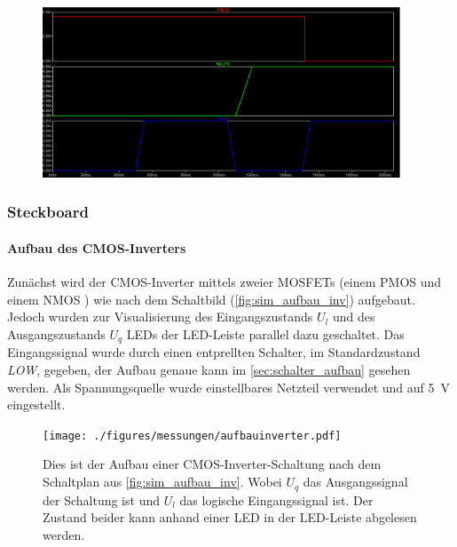\documentclass[12pt,english,ngerman]{scrartcl}
\begin{document}
\begin{figure}[H]
  \centering
    \includegraphics[width=0.95\textwidth]{./simdaten_lab/cmos/nand/nand_funktion.png}
  \caption{}
  \label{fig:sim_nand_wahrheit}
\end{figure}

\subsubsection{Steckboard}
\paragraph{Aufbau des CMOS-Inverters}\label{sec:mess_cmos}
Zunächst wird der CMOS-Inverter mittels zweier MOSFETs (einem PMOS \cite{ZVP2106A} und
einem NMOS \cite{ZVN2106A}) wie nach dem Schaltbild (\autoref{fig:sim_aufbau_inv})
aufgebaut. Jedoch wurden zur Visualisierung des Eingangszustands $U_l$ und des
Ausgangszustands $U_q$ LEDs der LED-Leiste parallel dazu geschaltet. Das
Eingangssignal wurde durch einen entprellten Schalter, im Standardzustand
\textit{LOW}, gegeben, der Aufbau genaue kann im \autoref{sec:schalter_aufbau} gesehen werden. Als
Spannungsquelle wurde einstellbares Netzteil verwendet und auf \SI{5}{\volt}
eingestellt. 

\begin{figure}[H]
  \centering
    \texttt{[image: ./figures/messungen/aufbauinverter.pdf]}
  \caption{Dies ist der Aufbau einer CMOS-Inverter-Schaltung nach dem
  Schaltplan aus \autoref{fig:sim_aufbau_inv}. Wobei $U_q$ das Ausgangssignal
  der Schaltung ist  und $U_l$ das logische Eingangssignal ist. Der Zustand
  beider kann anhand einer LED in der LED-Leiste abgelesen werden.}
  \label{fig:mess_aufbau_inv}
\end{figure}
\end{document}
